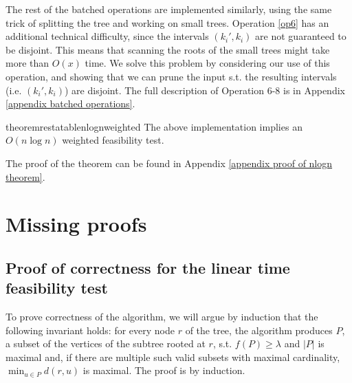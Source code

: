 \documentclass[a4paper,UKenglish]{lipics-v2016}
\theoremstyle{plain}
\begin{document}
The rest of the batched operations are implemented similarly, using the same trick of splitting the tree and working on small trees. Operation \ref{op6} has an additional technical difficulty, since the intervals $(k_i',k_i)$ are not guaranteed to be disjoint. This means that scanning the roots of the small trees might take more than $O(x)$ time. We solve this problem by considering our use of this operation, and showing that we can prune the input s.t. the resulting intervals (i.e. $(k_i',k_i)$) are disjoint. The full description of Operation 6-8 is in Appendix \ref{appendix batched operations}.

\begin{restatable}{theoremrestatable}{nlognweighted}
\label{nlogn weighted f.t. theorem}
The above implementation implies an $O(n \log n)$ weighted feasibility test.
\end{restatable}
The proof of the theorem can be found in Appendix \ref{appendix proof of nlogn theorem}.



\newpage
\appendix

\section{Missing proofs}

\subsection{Proof of correctness for the linear time feasibility test}\label{appendix proof of correctness for linear f.t.}

To prove correctness of the algorithm, we will argue by induction that the following invariant holds: for every node $r$ of the tree, the algorithm
produces $P$, a subset of the vertices of the subtree rooted at $r$, s.t. $f(P)\geq\lambda$ and $|P|$ is maximal and, if there are multiple
such valid subsets with maximal cardinality, $\min_{u\in P} d(r,u)$ is maximal. The proof is by induction.
\end{document}
